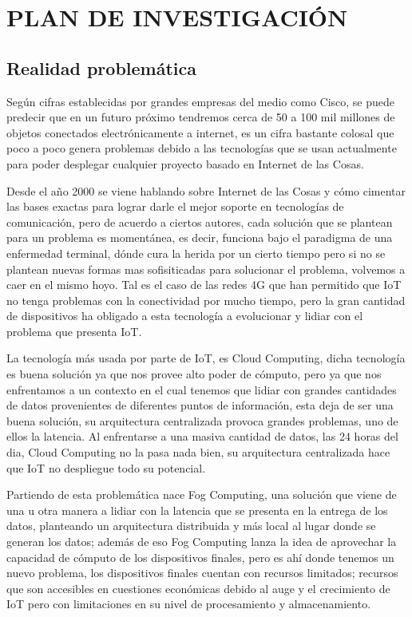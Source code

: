 \newpage

\section{PLAN DE INVESTIGACIÓN}
    \subsection{Realidad problemática}
        Según cifras establecidas por grandes empresas del medio como Cisco,  se puede predecir que en un futuro próximo tendremos cerca de 50 a 100 mil millones de objetos conectados electrónicamente a internet, es un cifra bastante colosal que poco a poco genera problemas debido a las tecnologías que se usan actualmente para poder desplegar cualquier proyecto basado en Internet de las Cosas.\par
        Desde el año 2000 se viene hablando sobre Internet de las Cosas y cómo cimentar las bases exactas para lograr darle el mejor soporte en tecnologías de comunicación, pero de acuerdo a ciertos autores, cada solución que se plantean para un problema es momentánea, es decir, funciona bajo el paradigma de una enfermedad terminal, dónde cura la herida por un cierto tiempo pero si no se plantean nuevas formas mas sofisiticadas para solucionar el problema, volvemos a caer en el mismo hoyo. Tal es el caso de las redes 4G que han permitido que IoT no tenga problemas con la conectividad por mucho tiempo, pero la gran cantidad de dispositivos ha obligado a esta tecnología a evolucionar y lidiar con el problema que presenta IoT.\par
        La tecnología más usada por parte de IoT, es Cloud Computing, dicha tecnología es buena solución ya que nos provee alto poder de cómputo, pero ya que nos enfrentamos a un contexto en el cual tenemos que lidiar con grandes cantidades de datos provenientes de diferentes puntos de información, esta deja de ser una buena solución,  su arquitectura centralizada provoca grandes problemas, uno de ellos la latencia. Al enfrentarse a una masiva cantidad de datos, las 24 horas del dia, Cloud Computing no la pasa nada bien, su arquitectura centralizada hace que IoT no despliegue todo su potencial. \par
        Partiendo de esta problemática nace Fog Computing, una solución que viene de una u otra manera  a lidiar con la latencia que se presenta en la entrega de los datos, planteando un arquitectura distribuida y más local al lugar donde se generan los datos; además de eso Fog Computing lanza la idea de aprovechar la capacidad de cómputo de los dispositivos finales, pero es ahí donde tenemos un nuevo problema, los dispositivos finales cuentan con recursos limitados; recursos que son accesibles en cuestiones económicas debido al auge y el crecimiento de IoT pero con limitaciones en su nivel de procesamiento y almacenamiento.\par
